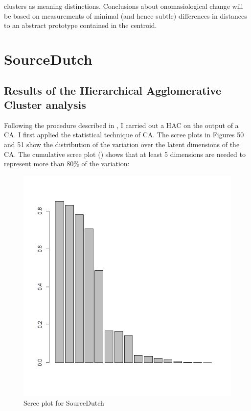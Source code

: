 clusters as meaning distinctions. Conclusions about onomasiological change will be based on measurements of minimal (and hence subtle) differences in distances to an abstract prototype contained in the centroid. 

\section{SourceDutch}
\label{sec:4.2}  
\subsection{Results of the Hierarchical Agglomerative Cluster analysis}
\label{sec:4.2.1}  
Following the procedure described in , I carried out a HAC on the output of a CA. I first applied the statistical technique of CA. The scree plots in Figures 50 and 51 show the distribution of the variation over the latent dimensions of the CA. The cumulative scree plot () shows that at least 5 dimensions are needed to represent more than 80\% of the variation:

\begin{figure}
\includegraphics[height=.4\textheight]{figures/Vandevoorde2-img50.png}
\caption{\label{fig:4:50}  Scree plot for SourceDutch}
\end{figure}

